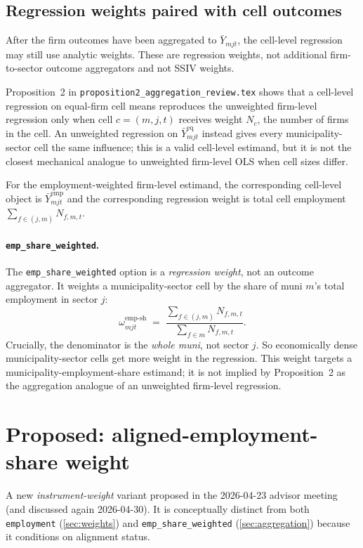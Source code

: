 \documentclass[12pt]{article}
\theoremstyle{definition}
\begin{document}
\subsection*{Regression weights paired with cell outcomes}

After the firm outcomes have been aggregated to $\bar Y_{mjt}$, the cell-level regression may still use analytic weights. These are regression weights, not additional firm-to-sector outcome aggregators and not SSIV weights.

Proposition~2 in \texttt{proposition2\_aggregation\_review.tex} shows that a cell-level regression on equal-firm cell means reproduces the unweighted firm-level regression only when cell $c=(m,j,t)$ receives weight $N_c$, the number of firms in the cell. An unweighted regression on $\bar Y^{\text{eq}}_{mjt}$ instead gives every municipality-sector cell the same influence; this is a valid cell-level estimand, but it is not the closest mechanical analogue to unweighted firm-level OLS when cell sizes differ.

For the employment-weighted firm-level estimand, the corresponding cell-level object is $\bar Y^{\text{emp}}_{mjt}$ and the corresponding regression weight is total cell employment $\sum_{f\in(j,m)} N_{f,m,t}$.

\paragraph{\texttt{emp\_share\_weighted}.}
The \texttt{emp\_share\_weighted} option is a \emph{regression weight}, not an outcome aggregator. It weights a municipality-sector cell by the share of muni $m$'s total employment in sector $j$:
\[
  \omega^{\text{emp-sh}}_{m j t} \;=\; \frac{\sum_{f \in (j,m)} N_{f,m,t}}{\sum_{f \in m} N_{f,m,t}}.
\]
Crucially, the denominator is the \emph{whole muni}, not sector $j$. So economically dense municipality-sector cells get more weight in the regression. This weight targets a municipality-employment-share estimand; it is not implied by Proposition~2 as the aggregation analogue of an unweighted firm-level regression.

\section{Proposed: aligned-employment-share weight}
\label{sec:aligned-emp-share}

A new \emph{instrument-weight} variant proposed in the 2026-04-23 advisor meeting (and discussed again 2026-04-30). It is conceptually distinct from both \texttt{employment} (\cref{sec:weights}) and \texttt{emp\_share\_weighted} (\cref{sec:aggregation}) because it conditions on alignment status.
\end{document}
